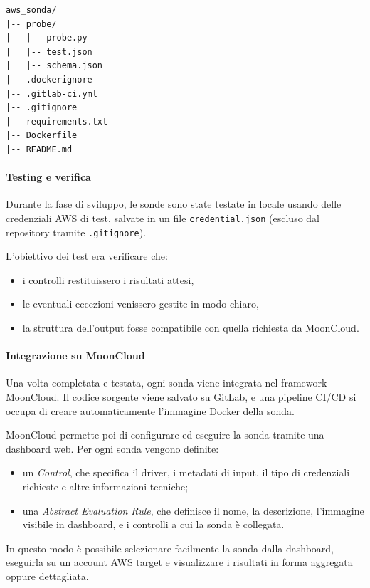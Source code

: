 \begin{lstlisting}[caption={Struttura di ogni sonda per MoonCloud}]
aws_sonda/
|-- probe/
|   |-- probe.py
|   |-- test.json
|   |-- schema.json
|-- .dockerignore
|-- .gitlab-ci.yml
|-- .gitignore  
|-- requirements.txt
|-- Dockerfile
|-- README.md
\end{lstlisting}

\paragraph{Testing e verifica} Durante la fase di sviluppo, le sonde sono state testate in locale usando delle credenziali AWS di test, salvate in un file \texttt{credential.json} (escluso dal repository tramite \texttt{.gitignore}).

L'obiettivo dei test era verificare che:
\begin{itemize}
    \item i controlli restituissero i risultati attesi,
    \item le eventuali eccezioni venissero gestite in modo chiaro,
    \item la struttura dell'output fosse compatibile con quella richiesta da MoonCloud.
\end{itemize}

\paragraph{Integrazione su MoonCloud} Una volta completata e testata, ogni sonda viene integrata nel framework MoonCloud. Il codice sorgente viene salvato su GitLab, e una pipeline CI/CD si occupa di creare automaticamente l'immagine Docker della sonda.

MoonCloud permette poi di configurare ed eseguire la sonda tramite una dashboard web. Per ogni sonda vengono definite:
\begin{itemize}
    \item un \textit{Control}, che specifica il driver, i metadati di input, il tipo di credenziali richieste e altre informazioni tecniche;
    \item una \textit{Abstract Evaluation Rule}, che definisce il nome, la descrizione, l'immagine visibile in dashboard, e i controlli a cui la sonda è collegata.
\end{itemize}

In questo modo è possibile selezionare facilmente la sonda dalla dashboard, eseguirla su un account AWS target e visualizzare i risultati in forma aggregata oppure dettagliata.


